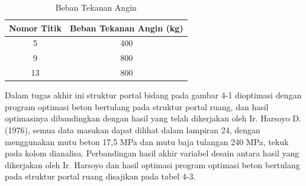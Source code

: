 \begin{table}[htbp]
\centering
\caption{Beban Tekanan Angin}
\label{tab:4-2}
\begin{tabular}{cc}
\toprule
Nomor Titik & Beban Tekanan Angin (kg) \\
\midrule
5  & 400 \\
9  & 800 \\
13 & 800 \\
\bottomrule
\end{tabular}
\end{table}

Dalam tugas akhir ini struktur portal bidang pada gambar 4-1 dioptimasi
dengan program optimasi beton bertulang pada struktur portal ruang, dan
hasil optimasinya dibandingkan dengan hasil yang telah dikerjakan oleh
Ir. Harsoyo D. (1976), semua data masukan dapat dilihat dalam lampiran
24, dengan menggunakan mutu beton 17,5 MPa dan mutu baja tulangan 240
MPa, tekuk pada kolom dianalisa. Perbandingan hasil akhir variabel desain
antara hasil yang dikerjakan oleh Ir. Harsoyo dan hasil optimasi program
optimasi beton bertulang pada struktur portal ruang disajikan pada tabel
4-3.

